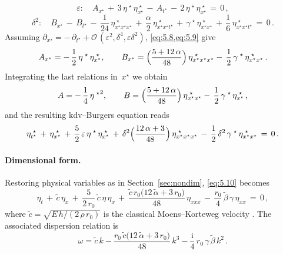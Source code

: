 \documentclass[alpha-refs, 12pt]{wiley-article}
\renewcommand{\O}{\mathcal{O}}
\newcommand{\ui}{\mathrm{i}}
\newcommand{\eps}{\varepsilon}
\begin{document}
\begin{equation}\label{eq:5.8}
  \eps:\quad
  A_{x^{\star}}\,+\,3\,\eta^{\;\star}\,\eta^{\;\star}_{x^{\star}}\,-\,A_{t^{\star}}\,-\,2\,\eta^{\;\star}\,\eta^{\;\star}_{x^{\star}}\,=\,0\,,
\end{equation}
\begin{equation}\label{eq:5.9}
  \delta^{2}:\quad
  B_{x^{\star}}\,-\,B_{t^{\star}}\,-\,\frac{1}{24}\,\eta^{\;\star}_{x^{\star}x^{\star}x^{\star}}\,+\,\frac{\alpha}{2}\,
  \eta^{\;\star}_{x^{\star}x^{\star}t^{\star}}
  \,+\,\gamma^{\;\star}\,\eta^{\;\star}_{x^{\star}x^{\star}}\,+\,\frac{1}{6}\,\eta^{\;\star}_{x^{\star}x^{\star}t^{\star}}\,=\,0\,.
\end{equation}
Assuming $\partial_{x^{\star}} = -\,\partial_{t^{\star}} + \O\,(\eps^{2},\delta^{4},\eps\delta^{2})$, \cref{eq:5.8,eq:5.9} give
\begin{equation*}
  A_{x^{\star}}=-\,\frac{1}{2}\,\eta^{\;\star}\,\eta^{\;\star}_{x^{\star}}, \qquad
  B_{x^{\star}}=\Bigl(\frac{5+12\,\alpha}{48}\Bigr)\,\eta^{\;\star}_{x^{\star}x^{\star}x^{\star}}
  -\,\frac{1}{2}\,\gamma^{\;\star}\,\eta^{\;\star}_{x^{\star}x^{\star}}\,.
\end{equation*}
Integrating the last relations in~$x^{\star}$ we obtain
\begin{equation*}
  A=-\,\frac{1}{4}\,{\eta^{\;\star}}^{2},\qquad
  B=\Bigl(\frac{5+12\,\alpha}{48}\Bigr)\,\eta^{\;\star}_{x^{\star}x^{\star}}
  -\,\frac{1}{2}\,\gamma^{\;\star}\,\eta^{\;\star}_{x^{\star}}\,,
\end{equation*}
and the resulting \acrshort{kdv}--Burgers equation reads
\begin{equation}\label{eq:5.10}
  \eta^{\;\star}_{t^{\star}}\,+\,\eta^{\;\star}_{x^{\star}}
  \,+\,\frac{5}{2}\,\eps\,\eta^{\;\star}\,\eta^{\;\star}_{x^{\star}}
  \,+\,\delta^{2}\Bigl(\frac{12\,\alpha+3}{48}\Bigr)\,\eta^{\;\star}_{x^{\star}x^{\star}x^{\star}}
  \,-\,\frac{1}{2}\,\delta^{2}\,\gamma^{\;\star}\,\eta^{\;\star}_{x^{\star}x^{\star}}\,=\,0\,.
\end{equation}

\paragraph{Dimensional form.} Restoring physical variables as in Section~\ref{sec:nondim}, \cref{eq:5.10} becomes
\begin{equation}\label{eq:KdVdim}
  \eta_{t}\,+\,\tilde{c}\,\eta_{x}\,+\,\frac{5}{2\,r_{0}}\,\tilde{c}\,\eta\,\eta_{x}\, + \,\frac{\tilde{c}\,r_{0}\bigl(12\,\tilde{\alpha}+3\,r_{0}\bigr)}{48}\,\eta_{xxx}\, - \,\frac{r_{0}}{4}\,\tilde{\beta}\,\gamma\,\eta_{xx}\,=\,0\,,
\end{equation}
where $\tilde{c}=\sqrt{E\,h/(2\,\rho\,r_{0})}$ is the classical Moens--Korteweg velocity
\cite{Fung1997a}. The associated dispersion relation is
\begin{equation*}
  \omega=\tilde{c}\,k - \frac{r_{0}\,\tilde{c}\bigl(12\,\tilde{\alpha}+3\,r_{0}\bigr)}{48}\,k^{3} - \frac{\ui}{4}\,r_{0}\,\gamma\,\tilde{\beta}\,k^{2}\,.
\end{equation*}
\end{document}
